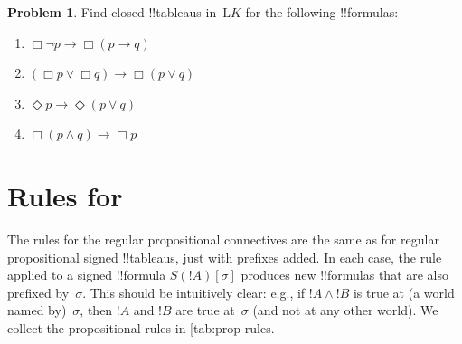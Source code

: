 \documentclass[10pt,a4paper]{article}
\makeatletter
\theoremstyle{plain}
\theoremstyle{definition}
\newtheorem{prob}{Problem}[section]
\theoremstyle{remark}
\newcommand*{\olfileid}[3]{}
\newcommand*{\olsection}[1]{\section*{#1}}
\newcommand{\olref}{\@ifnextchar[{\olref@i}{\olref@final}}
\def\olref@i[#1]{\@ifnextchar[{\olref@ii}{\olref@final}}
\def\olref@ii[#1]{\@ifnextchar[{\olref@iii}{\olref@final}}
\def\olref@iii[#1]{\olref@final}
\def\olref@final#1{\ref{#1}}
\providecommand{\lif}{\mathbin{\rightarrow}}
\providecommand{\sFmla}[2]{#1(#2)}
\providecommand{\Log}{\ensuremath{\mathrm{L}}}
\providecommand{\Ax}{\mathrm{Ax}}
\makeatother
\begin{document}
\begin{prob}
  Find closed !!{tableau}s in~$\Log{K}$ for the following !!{formula}s:
  \begin{enumerate}
    \item $\Box \lnot p \lif \Box(p \lif q)$
    \item $(\Box p \lor \Box q) \lif \Box(p \lor q)$
    \item $\Diamond p \lif \Diamond(p \lor q)$
    \item $\Box(p \land q) \lif \Box p$
  \end{enumerate}
\end{prob}





\olfileid{nml}{tab}{rul}

\olsection{Rules for \Ax{K}}

The rules for the regular propositional connectives are the same as
for regular propositional signed !!{tableau}s, just with prefixes
added. In each case, the rule applied to a signed !!{formula}
$\sFmla{S}{!A}[\sigma]$ produces new !!{formula}s that are also
prefixed by~$\sigma$. This should be intuitively clear: e.g., if $!A
\land !B$ is true at (a world named by)~$\sigma$, then $!A$ and $!B$
are true at~$\sigma$ (and not at any other world). We collect the
propositional rules in \olref{tab:prop-rules}.
\end{document}
